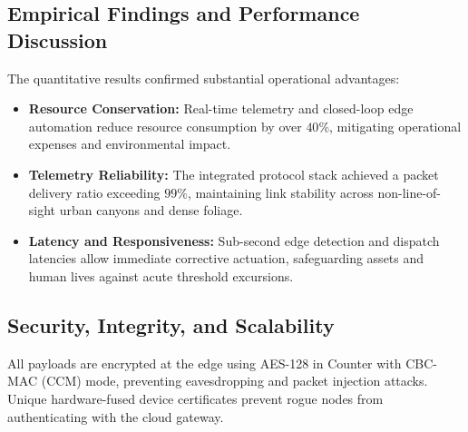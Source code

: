 \subsection{Empirical Findings and Performance Discussion}
The quantitative results confirmed substantial operational advantages:
\begin{itemize}
  \item \textbf{Resource Conservation:} Real-time telemetry and closed-loop edge automation reduce resource consumption by over $40\%$, mitigating operational expenses and environmental impact.
  \item \textbf{Telemetry Reliability:} The integrated protocol stack achieved a packet delivery ratio exceeding $99\%$, maintaining link stability across non-line-of-sight urban canyons and dense foliage.
  \item \textbf{Latency and Responsiveness:} Sub-second edge detection and dispatch latencies allow immediate corrective actuation, safeguarding assets and human lives against acute threshold excursions.
\end{itemize}

\subsection{Security, Integrity, and Scalability}
All payloads are encrypted at the edge using AES-128 in Counter with CBC-MAC (CCM) mode, preventing eavesdropping and packet injection attacks. Unique hardware-fused device certificates prevent rogue nodes from authenticating with the cloud gateway.
